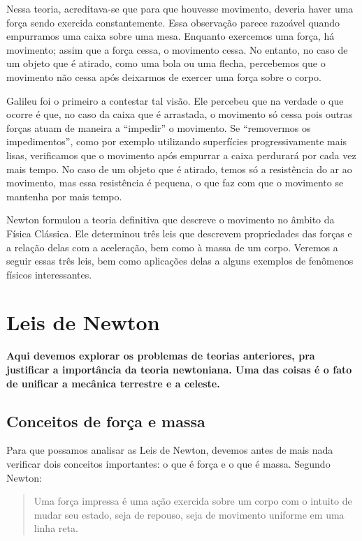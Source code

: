 Nessa teoria, acreditava-se que para que houvesse movimento, deveria haver uma força sendo exercida constantemente. Essa observação parece razoável quando empurramos uma caixa sobre uma mesa. Enquanto exercemos uma força, há movimento; assim que a força cessa, o movimento cessa. No entanto, no caso de um objeto que é atirado, como uma bola ou uma flecha, percebemos que o movimento não cessa após deixarmos de exercer uma força sobre o corpo.

Galileu foi o primeiro a contestar tal visão. Ele percebeu que na verdade o que ocorre é que, no caso da caixa que é arrastada, o movimento só cessa pois outras forças atuam de maneira a ``impedir'' o movimento. Se ``removermos os impedimentos'', como por exemplo utilizando superfícies progressivamente mais lisas, verificamos que o movimento após empurrar a caixa perdurará por cada vez mais tempo. No caso de um objeto que é atirado, temos só a resistência do ar ao movimento, mas essa resistência é pequena, o que faz com que o movimento se mantenha por mais tempo.

Newton formulou a teoria definitiva que descreve o movimento no âmbito da Física Clássica. Ele determinou três leis que descrevem propriedades das forças e a relação delas com a aceleração, bem como à massa de um corpo. Veremos a seguir essas três leis, bem como aplicações delas a alguns exemplos de fenômenos físicos interessantes.

\section{Leis de Newton}

\textbf{Aqui devemos explorar os problemas de teorias anteriores, pra justificar a importância da teoria newtoniana. Uma das coisas é o fato de unificar a mecânica terrestre e a celeste.}

\subsection{Conceitos de força e massa}

Para que possamos analisar as Leis de Newton, devemos antes de mais nada verificar dois conceitos importantes: o que é força e o que é massa. Segundo Newton:

\begin{quote}
    Uma força impressa é uma ação exercida sobre um corpo com o intuito de mudar seu estado, seja de repouso, seja de movimento uniforme em uma linha reta.
\end{quote}

